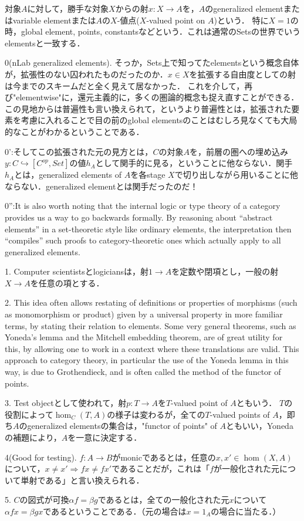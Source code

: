 \documentclass[uplatex, 12pt, dvipdfmx]{jsarticle}
\begin{document}
\begin{definition*}
    対象$A$に対して，勝手な対象$X$からの射$x:X\to A$を，$A$のgeneralized elementまたはvariable elementまたは$A$の$X$-値点($X$-valued point on $A$)という．
    特に$X=1$の時，global element, points, constantsなどという．これは通常のSetsの世界でいうelementsと一致する．
\end{definition*}
\begin{remark*}

    0(nLab generalized elements). そっか，Sets上で知ってたelementsという概念自体が，拡張性のない囚われたものだったのか．$x\in X$を拡張する自由度としての射は今までのスキームだと全く見えて居なかった．
    これを介して，再び"elementwise"に，還元主義的に，多くの圏論的概念も捉え直すことができる．この見地からは普遍性も言い換えられて，というより普遍性とは，拡張された要素を考慮に入れることで目の前のglobal elementsのことはむしろ見なくても大局的なことがわかるということである．

    0':そしてこの拡張された元の見方とは，$C$の対象$A$を，前層の圏への埋め込み$y:C\hookrightarrow [C^{op},Set]$の値$h_A$として関手的に見る，ということに他ならない．関手$h_A$とは，generalized elements of $A$を各stage $X$で切り出しながら用いることに他ならない．generalized elementとは関手だったのだ！

    0'':It is also worth noting that the internal logic or type theory of a category provides us a way to go backwards formally. By reasoning about “abstract elements” in a set-theoretic style like ordinary elements, the interpretation then “compiles” such proofs to category-theoretic ones which actually apply to all generalized elements.

    1. Computer scientistsとlogiciansは，射$1\to A$を定数や閉項とし，一般の射$X\to A$を任意の項とする．

    2. This idea often allows restating of definitions or properties of morphisms (such as monomorphism or product) given by a universal property in more familiar terms, by stating their relation to elements. Some very general theorems, such as Yoneda's lemma and the Mitchell embedding theorem, are of great utility for this, by allowing one to work in a context where these translations are valid. This approach to category theory, in particular the use of the Yoneda lemma in this way, is due to Grothendieck, and is often called the method of the functor of points.

    3. Test objectとして使われて，射$p:T\to A$を$T$-valued point of $A$ともいう．
    $T$の役割によって$\hom_C(T,A)$の様子は変わるが，全ての$T$-valued points of $A$，即ち$A$のgeneralized elementsの集合は，"functor of points" of $A$ともいい，Yonedaの補題により，$A$を一意に決定する．

    4(Good for testing). $f:A\to B$がmonicであるとは，任意の$x,x'\in\hom(X,A)$について，$x\ne x'\Rightarrow fx\ne fx'$であることだが，これは「$f$が一般化された元について単射である」と言い換えられる．

    5. $C$の図式が可換$\alpha f=\beta g$であるとは，全ての一般化された元$x$について$\alpha fx=\beta gx$であるということである．（元の場合は$x=1_A$の場合に当たる．）
\end{remark*}
\end{document}
